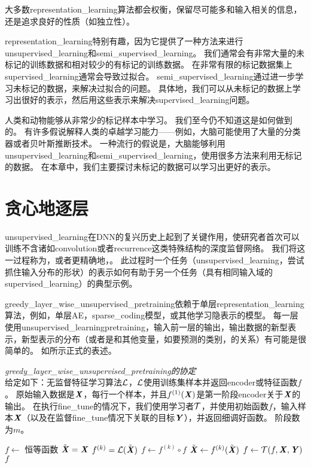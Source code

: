 大多数\gls{representation_learning}算法都会权衡，保留尽可能多和输入相关的信息，还是追求良好的性质（如独立性）。


\gls{representation_learning}特别有趣，因为它提供了一种方法来进行\gls{unsupervised_learning}和\gls{semi_supervised_learning}。
我们通常会有非常大量的未标记的训练数据和相对较少的有标记的训练数据。
在非常有限的标记数据集上\gls{supervised_learning}通常会导致过拟合。
\gls{semi_supervised_learning}通过进一步学习未标记的数据，来解决过拟合的问题。
具体地，我们可以从未标记的数据上学习出很好的表示，然后用这些表示来解决\gls{supervised_learning}问题。


人类和动物能够从非常少的标记样本中学习。
我们至今仍不知道这是如何做到的。
有许多假说解释人类的卓越学习能力——例如，大脑可能使用了大量的分类器或者贝叶斯推断技术。
一种流行的假说是，大脑能够利用\gls{unsupervised_learning}和\gls{semi_supervised_learning}，使用很多方法来利用无标记的数据。
在本章中，我们主要探讨未标记的数据可以学习出更好的表示。


\section{贪心地逐层 }
\label{sec:greedy_layer_wise_unsupervised_pretraining}
\gls{unsupervised_learning}在\gls{DNN}的复兴历史上起到了关键作用，使研究者首次可以训练不含诸如\gls{convolution}或者\gls{recurrence}这类特殊结构的深度监督网络。
我们将这一过程称为，或者更精确地，。
此过程时一个任务（\gls{unsupervised_learning}，尝试抓住输入分布的形状）的表示如何有助于另一个任务（具有相同输入域的\gls{supervised_learning}）的典型示例。


\gls{greedy_layer_wise_unsupervised_pretraining}依赖于单层\gls{representation_learning}算法，例如，单层\gls{AE}，\gls{sparse_coding}模型，或其他学习隐表示的模型。
每一层使用\gls{unsupervised_learning}\gls{pretraining}，输入前一层的输出，输出数据的新型表示，新型表示的分布（或者是和其他变量，如要预测的类别，的关系）有可能是很简单的。
如所示正式的表述。

\begin{algorithm}
\caption{ {\em \gls{greedy_layer_wise_unsupervised_pretraining}的协定}\\
给定如下：无监督特征学习算法$\mathcal{L}$，$\mathcal{L}$使用训练集样本并返回\gls{encoder}或特征函数$f$。
原始输入数据是$\boldsymbol{\mathit{X}}$，每行一个样本，并且$f^{(1)}(\boldsymbol{\mathit{X}})$是第一阶段\gls{encoder}关于$\boldsymbol{\mathit{X}}$的输出。
在执行\gls{fine_tune}的情况下，我们使用学习者$\mathcal{T}$，并使用初始函数$f$，输入样本$\boldsymbol{\mathit{X}}$（以及在监督\gls{fine_tune}情况下关联的目标$\boldsymbol{\mathit{Y}}$），并返回细调好函数。 阶段数为$m$。
}
\label{alg:pretraining}
\begin{algorithmic}
\STATE $f \leftarrow$ 恒等函数
\STATE $\tilde{\boldsymbol{\mathit{X}}} = \boldsymbol{\mathit{X}}$
  \STATE $f^{(k)} = {\mathcal{L}}(\tilde{\boldsymbol{\mathit{X}}})$
  \STATE $f \leftarrow f^{(k)} \circ f$
  \STATE $\tilde{\boldsymbol{\mathit{X}}} \leftarrow f^{(k)}(\tilde{\boldsymbol{\mathit{X}}})$
\ENDFOR
{}
  \STATE $f \leftarrow {\mathcal{T}}(f,\boldsymbol{\mathit{X}},\boldsymbol{\mathit{Y}})$
\ENDIF
{} $f$
\end{algorithmic}
\end{algorithm}


